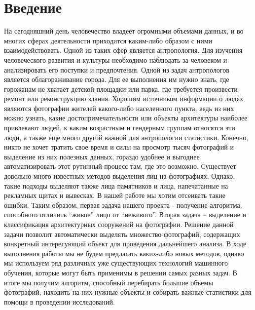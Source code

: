 \documentclass[a4paper,14pt]{extarticle}
\begin{document}
    \section{Введение}
    На сегодняшний день человечество владеет огромными объемами данных, и во многих сферах деятельности приходится каким-либо образом с ними взаимодействовать. Одной из таких сфер является антропология. Для изучения человеческого развития и культуры необходимо наблюдать за человеком и анализировать его поступки и предпочтения. Одной из задач антропологов является облагораживание города. Для ее выполнения им нужно знать, где горожанам не хватает детской площадки или парка, где требуется произвести ремонт или реконструкцию здания. Хорошим источником информации о людях являются фотографии жителей какого-либо населенного пункта, ведь из них можно узнать, какие достопримечательности или объекты архитектуры наиболее привлекают людей, к каким возрастным и гендерным группам относятся эти люди, а также еще много другой важной для антропологии статистики. Конечно, никто не хочет тратить свое время и силы на просмотр тысяч фотографий и выделение из них полезных данных, гораздо удобнее и выгоднее автоматизировать этот рутинный процесс там, где это возможно.
    Существует довольно много известных методов выделения лиц на фотографиях. Однако, такие подходы выделяют также лица памятников и лица, напечатанные на рекламных щитах и вывесках. В нашей работе мы хотим отсеивать такие ошибки. Таким образом, первая задача нашего проекта - получение алгоритма, способного отличить “живое” лицо от “неживого”.
    Вторая задача – выделение и классификация архитектурных сооружений на фотографии. Решение данной задачи позволит автоматически выделять множество фотографий, содержащих конкретный интересующий объект для проведения дальнейшего анализа.
    В ходе выполнения работы мы не будем предлагать каких-либо новых методов, однако мы используем ряд различных уже существующих технологий машинного обучения, которые могут быть применимы в решении самых разных задач. В итоге мы получим алгоритм, способный перебирать большие объемы фотографий, находить на них нужные объекты и собирать важные статистики для помощи в проведении исследований.
    \newpage
    
\end{document}
